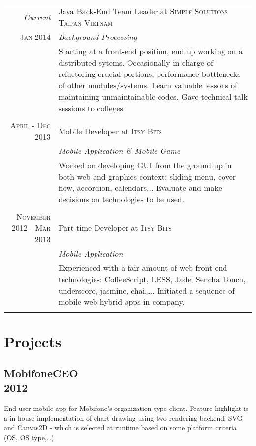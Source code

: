 \documentclass[a4paper,10pt]{article}
\begin{document}
\begin{tabular}{r|p{11cm}}

    \emph{Current} & Java Back-End Team Leader at \textsc{Simple Solutions Taipan Vietnam} \\\textsc{Jan 2014}&\emph{Background Processing}\\&\footnotesize{Starting at a front-end position, end up working on a distributed sytems. Occasionally in charge of refactoring crucial portions, performance bottlenecks of other modules/systems. Learn valuable lessons of maintaining unmaintainable codes. Gave technical talk sessions to colleges}\\\multicolumn{2}{c}{} \\

    \textsc{April - Dec 2013 } & Mobile Developer at \textsc{Itsy Bits} \\&\emph{Mobile Application \& Mobile Game}\\&\footnotesize{Worked on developing GUI from the ground up in both web and graphics context: sliding menu, cover flow, accordion, calendars... Evaluate and make decisions on technologies to be used.}\\\multicolumn{2}{c}{} \\

    \textsc{November 2012 - Mar 2013} & Part-time Developer at \textsc{Itsy Bits} \\&\emph{Mobile Application}\\&\footnotesize{Experienced with a fair amount of web front-end technologies: CoffeeScript, LESS, Jade, Sencha Touch, underscore, jasmine, chai,\ldots. Initiated a sequence of mobile web hybrid apps in company.}\\\multicolumn{2}{c}{} \\

\end{tabular}

\section{Projects}


\subsection*{MobifoneCEO\\\small 2012}

End-user mobile app for Mobifone's organization type client. Feature highlight is a in-house implementation of chart drawing using two rendering backend: SVG and Canvas2D - which is selected at runtime based on some platform criteria (OS, OS type,\ldots).
\end{document}
